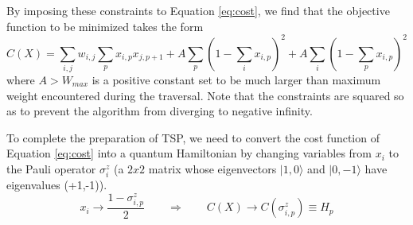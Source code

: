 By imposing these constraints to Equation \ref{eq:cost}, we find that the objective function to be minimized takes the form
\begin{equation}
	C(X)=\sum_{i,j}w_{i,j} \sum_p x_{i,p}x_{j,p+1} + A\sum_p (1 - \sum_i x_{i,p})^2 + A\sum_i (1 - \sum_p x_{i,p})^2
	\label{eq:hamiltoniancircuit}
\end{equation}
where $A>W_{max}$ is a positive constant set to be much larger than maximum weight encountered during the traversal. Note that the constraints are squared so as to prevent the algorithm from diverging to negative infinity. 

To complete the preparation of TSP, we need to convert the cost function of Equation \ref{eq:cost} into a quantum Hamiltonian by changing variables from $x_i$ to the Pauli operator $\sigma_i^z$ (a $2x2$ matrix whose eigenvectors $|1,0\rangle$ and $|0,-1\rangle$ have eigenvalues (+1,-1)). 
\begin{equation}
	x_i \rightarrow \frac{ 1-\sigma_{i,p}^z}{2} \qquad \Rightarrow \qquad C(X) \rightarrow C(\sigma_{i,p}^z) \equiv H_p
	\label{eq:transformation}
\end{equation}